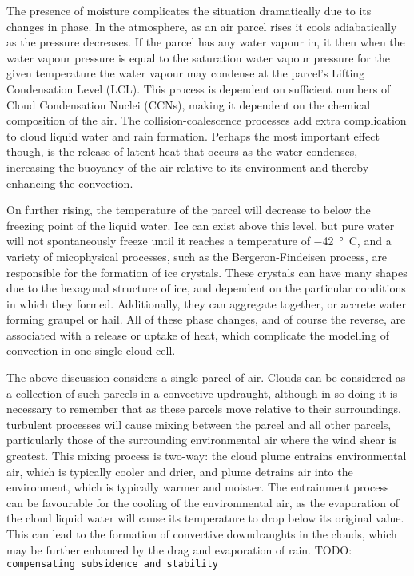\documentclass[11pt,a4paper]{article}
\newcommand{\todo}{TODO: \texttt}
\begin{document}
The presence of moisture complicates the situation dramatically due to its changes in phase. In the atmosphere, as an air parcel rises it cools adiabatically as the pressure decreases. If the parcel has any water vapour in, it then when the water vapour pressure is equal to the saturation water vapour pressure for the given temperature the water vapour may condense at the parcel's Lifting Condensation Level (LCL). This process is dependent on sufficient numbers of Cloud Condensation Nuclei (CCNs), making it dependent on the chemical composition of the air. The collision-coalescence processes add extra complication to cloud liquid water and rain formation. Perhaps the most important effect though, is the release of latent heat that occurs as the water condenses, increasing the buoyancy of the air relative to its environment and thereby enhancing the convection. 

On further rising, the temperature of the parcel will decrease to below the freezing point of the liquid water. Ice can exist above this level, but pure water will not spontaneously freeze until it reaches a temperature of \SI{-42}{\degree C}, and a variety of micophysical processes, such as the Bergeron-Findeisen process, are responsible for the formation of ice crystals. These crystals can have many shapes due to the hexagonal structure of ice, and dependent on the particular conditions in which they formed. Additionally, they can aggregate together, or accrete water forming graupel or hail. All of these phase changes, and of course the reverse, are associated with a release or uptake of heat, which complicate the modelling of convection in one single cloud cell.

The above discussion considers a single parcel of air. Clouds can be considered as a collection of such parcels in a convective updraught, although in so doing it is necessary to remember that as these parcels move relative to their surroundings, turbulent processes will cause mixing between the parcel and all other parcels, particularly those of the surrounding environmental air where the wind shear is greatest. This mixing process is two-way: the cloud plume entrains environmental air, which is typically cooler and drier, and plume detrains air into the environment, which is typically warmer and moister. The entrainment process can be favourable for the cooling of the environmental air, as the evaporation of the cloud liquid water will cause its temperature to drop below its original value. This can lead to the formation of convective downdraughts in the clouds, which may be further enhanced by the drag and evaporation of rain. \todo{compensating subsidence and stability}
\end{document}
